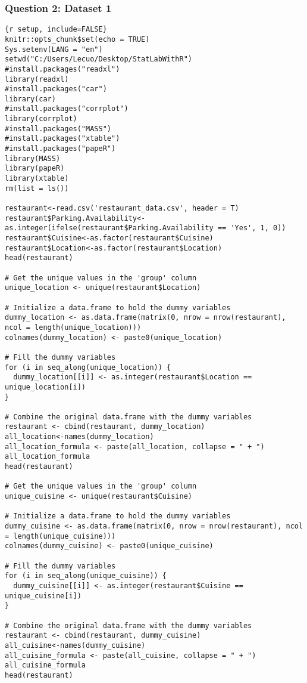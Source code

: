 \subsubsection{Question 2: Dataset 1}

\begin{lstlisting}
{r setup, include=FALSE}
knitr::opts_chunk$set(echo = TRUE)
Sys.setenv(LANG = "en")
setwd("C:/Users/Lecuo/Desktop/StatLabWithR")
#install.packages("readxl")
library(readxl)
#install.packages("car")
library(car)
#install.packages("corrplot")
library(corrplot)
#install.packages("MASS")
#install.packages("xtable")
#install.packages("papeR")
library(MASS)
library(papeR)
library(xtable)
rm(list = ls())

restaurant<-read.csv('restaurant_data.csv', header = T)
restaurant$Parking.Availability<-as.integer(ifelse(restaurant$Parking.Availability == 'Yes', 1, 0))
restaurant$Cuisine<-as.factor(restaurant$Cuisine)
restaurant$Location<-as.factor(restaurant$Location)
head(restaurant)

# Get the unique values in the 'group' column
unique_location <- unique(restaurant$Location)

# Initialize a data.frame to hold the dummy variables
dummy_location <- as.data.frame(matrix(0, nrow = nrow(restaurant), ncol = length(unique_location)))
colnames(dummy_location) <- paste0(unique_location)

# Fill the dummy variables
for (i in seq_along(unique_location)) {
  dummy_location[[i]] <- as.integer(restaurant$Location == unique_location[i])
}

# Combine the original data.frame with the dummy variables
restaurant <- cbind(restaurant, dummy_location)
all_location<-names(dummy_location)
all_location_formula <- paste(all_location, collapse = " + ")
all_location_formula
head(restaurant)

# Get the unique values in the 'group' column
unique_cuisine <- unique(restaurant$Cuisine)

# Initialize a data.frame to hold the dummy variables
dummy_cuisine <- as.data.frame(matrix(0, nrow = nrow(restaurant), ncol = length(unique_cuisine)))
colnames(dummy_cuisine) <- paste0(unique_cuisine)

# Fill the dummy variables
for (i in seq_along(unique_cuisine)) {
  dummy_cuisine[[i]] <- as.integer(restaurant$Cuisine == unique_cuisine[i])
}

# Combine the original data.frame with the dummy variables
restaurant <- cbind(restaurant, dummy_cuisine)
all_cuisine<-names(dummy_cuisine)
all_cuisine_formula <- paste(all_cuisine, collapse = " + ")
all_cuisine_formula
head(restaurant)


\end{lstlisting}
